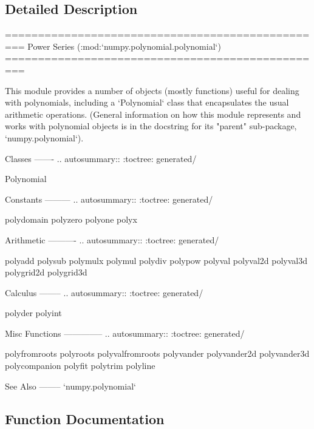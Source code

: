 \subsection{Detailed Description}
\begin{DoxyVerb}=================================================
Power Series (:mod:`numpy.polynomial.polynomial`)
=================================================

This module provides a number of objects (mostly functions) useful for
dealing with polynomials, including a `Polynomial` class that
encapsulates the usual arithmetic operations.  (General information
on how this module represents and works with polynomial objects is in
the docstring for its "parent" sub-package, `numpy.polynomial`).

Classes
-------
.. autosummary::
   :toctree: generated/

   Polynomial

Constants
---------
.. autosummary::
   :toctree: generated/

   polydomain
   polyzero
   polyone
   polyx

Arithmetic
----------
.. autosummary::
   :toctree: generated/

   polyadd
   polysub
   polymulx
   polymul
   polydiv
   polypow
   polyval
   polyval2d
   polyval3d
   polygrid2d
   polygrid3d

Calculus
--------
.. autosummary::
   :toctree: generated/

   polyder
   polyint

Misc Functions
--------------
.. autosummary::
   :toctree: generated/

   polyfromroots
   polyroots
   polyvalfromroots
   polyvander
   polyvander2d
   polyvander3d
   polycompanion
   polyfit
   polytrim
   polyline

See Also
--------
`numpy.polynomial`\end{DoxyVerb}
 

\subsection{Function Documentation}
\mbox{\label{namespacenumpy_1_1polynomial_1_1polynomial_a06729bcbf68875802f1bb7f6d1b9196d}} 
